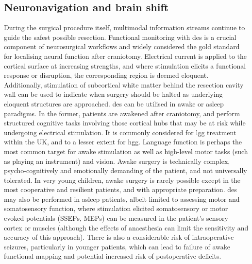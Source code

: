 \subsection{Neuronavigation and brain shift}

During the surgical procedure itself, multimodal information streams continue to guide the safest possible resection.
Functional monitoring with \gls{des} is a crucial component of neurosurgical workflows and widely considered the gold standard for localising neural function after craniotomy.
Electrical current is applied to the cortical surface at increasing strengths\autocite{Saito2015}, and where stimulation elicits a functional response or disruption, the corresponding region is deemed eloquent.
Additionally, stimulation of subcortical white matter behind the resection cavity wall can be used to indicate when surgery should be halted as underlying eloquent structures are approached\autocite{Sala2019}.
\gls{des} can be utilised in awake or asleep paradigms.
In the former, patients are awakened after craniotomy, and perform structured cognitive tasks involving those cortical hubs that may be at risk while undergoing electrical stimulation.
It is commonly considered for \gls{lgg} treatment within the UK, and to a lesser extent for \gls{hgg}\autocite{WykesV.2017}.
Language function is perhaps the most common target for awake stimulation as well as high-level motor tasks (such as playing an instrument) and vision\autocite{Mazerand2017}.
Awake surgery is technically complex, psycho-cognitively and emotionally demanding of the patient, and not universally tolerated\autocite{Nossek2013a,Wang2019}.
In very young children, awake surgery is rarely possible except in the most cooperative and resilient patients, and with appropriate preparation\autocite{Zolotova2022}.
\gls{des} may also be performed in asleep patients, albeit limited to assessing motor and somatosensory function, where stimulation elicited somatosensory or motor evoked potentials (SSEPs, MEPs) can be measured in the patient's sensory cortex or muscles\autocite{Stone2019} (although the effects of anaesthesia can limit the sensitivity and accuracy of this approach\autocite{Stone2019,WeissLucas2020}).
There is also a considerable risk of intraoperative seizures, particularly in younger patients, which can lead to failure of awake functional mapping and potential increased risk of postoperative deficits\autocite{Nossek2013,Wang2019,Rigolo2020a}.

